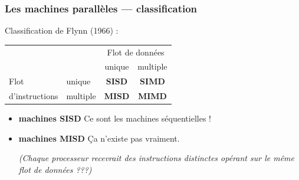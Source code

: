 \documentclass[xcolor={x11names,svgnames}]{beamer}
\begin{document}

\begin{frame}
\frametitle{Les machines parallèles --- classification}

\begin{block}{Classification de Flynn (1966) :}

  \begin{center}
    \begin{tabular}{|l|l|c|c|}
      \cline{3-4}
      \multicolumn{2}{c|}{}    & \multicolumn{2}{c|}{Flot de données} \\
      \cline{3-4}
      \multicolumn{2}{c|}{}    & unique & multiple \\
      \hline
      Flot           & unique   & \bf SISD   & \bf SIMD \\
      \cline{2-4}
      d'instructions & multiple & \bf MISD   & \bf MIMD \\
      \hline
    \end{tabular}
  \end{center}
\end{block}

\pause
  
  \begin{itemize}

  \item {\bf machines SISD} Ce sont les machines séquentielles !

  \item {\bf machines MISD} Ça n'existe pas vraiment.
    
    {\small \it (Chaque processeur recevrait des instructions distinctes opérant sur le même
    flot de données ???)}
  \end{itemize}

\end{frame}
\end{document}
